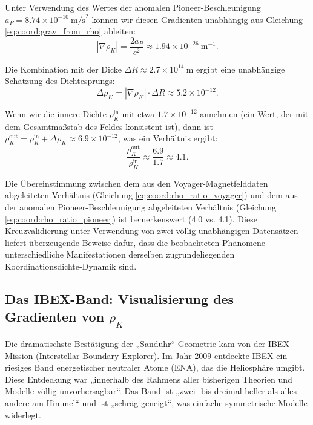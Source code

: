 \documentclass[12pt,a4paper]{article}
\theoremstyle{remark}
\begin{document}
	Unter Verwendung des Wertes der anomalen Pioneer-Beschleunigung $a_P = 8.74 \times 10^{-10}\ \text{m/s}^2$ können wir diesen Gradienten unabhängig aus Gleichung \eqref{eq:coord:grav_from_rho} ableiten:
	\begin{equation}
		|\nabla \rho_K| = \frac{2a_P}{c^2} \approx 1.94 \times 10^{-26}\ \text{m}^{-1}.
		\label{eq:coord:gradient_pioneer}
	\end{equation}
	
	Die Kombination mit der Dicke $\Delta R \approx 2.7 \times 10^{14}\ \text{m}$ ergibt eine unabhängige Schätzung des Dichtesprungs:
	\begin{equation}
		\Delta \rho_K = |\nabla \rho_K| \cdot \Delta R \approx 5.2 \times 10^{-12}.
		\label{eq:coord:delta_rho_pioneer}
	\end{equation}
	
	Wenn wir die innere Dichte $\rho_K^{\text{in}}$ mit etwa $1.7 \times 10^{-12}$ annehmen (ein Wert, der mit dem Gesamtmaßstab des Feldes konsistent ist), dann ist $\rho_K^{\text{out}} = \rho_K^{\text{in}} + \Delta \rho_K \approx 6.9 \times 10^{-12}$, was ein Verhältnis ergibt:
	\begin{equation}
		\frac{\rho_K^{\text{out}}}{\rho_K^{\text{in}}} \approx \frac{6.9}{1.7} \approx 4.1.
		\label{eq:coord:rho_ratio_pioneer}
	\end{equation}
	
	Die Übereinstimmung zwischen dem aus den Voyager-Magnetfelddaten abgeleiteten Verhältnis (Gleichung \eqref{eq:coord:rho_ratio_voyager}) und dem aus der anomalen Pioneer-Beschleunigung abgeleiteten Verhältnis (Gleichung \eqref{eq:coord:rho_ratio_pioneer}) ist bemerkenswert (4.0 vs. 4.1). Diese Kreuzvalidierung unter Verwendung von zwei völlig unabhängigen Datensätzen liefert überzeugende Beweise dafür, dass die beobachteten Phänomene unterschiedliche Manifestationen derselben zugrundeliegenden Koordinationsdichte-Dynamik sind.
	
	\subsection{Das IBEX-Band: Visualisierung des Gradienten von $\rho_K$}
	\label{subsec:coord:ibex}
	
	Die dramatischste Bestätigung der „Sanduhr“-Geometrie kam von der IBEX-Mission (Interstellar Boundary Explorer). Im Jahr 2009 entdeckte IBEX ein riesiges Band energetischer neutraler Atome (ENA), das die Heliosphäre umgibt. Diese Entdeckung war „innerhalb des Rahmens aller bisherigen Theorien und Modelle völlig unvorhersagbar“. Das Band ist „zwei- bis dreimal heller als alles andere am Himmel“ und ist „schräg geneigt“, was einfache symmetrische Modelle widerlegt.
	
\end{document}
